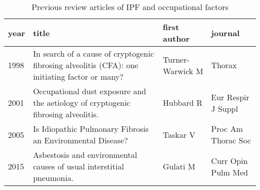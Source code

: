 \documentclass[a4paper,12pt]{article}
\begin{document}
\begin{table}
    \begin{tabular}{lp{6cm}ll}
    \textbf{year} & \textbf{title} &       \textbf{first author} &            \textbf{journal} \\
    \midrule
    1998    &  In search of a cause of cryptogenic fibrosing alveolitis (CFA): one initiating factor or many?       &  Turner-Warwick M &              Thorax \\
    2001    &               Occupational dust exposure and the aetiology of cryptogenic fibrosing alveolitis. &         Hubbard R &  Eur Respir J Suppl \\
    2005    &  Is Idiopathic Pulmonary Fibrosis an Environmental Disease?
            &          Taskar V &  Proc Am Thorac Soc \\
    2015    &                            Asbestosis and environmental causes of usual interstitial pneumonia.  &          Gulati M &  Curr Opin Pulm Med \\
    \bottomrule
    \end{tabular}
    \caption{Previous review articles of IPF and occupational factors}
    \label{table:reviews}
\end{table}
\end{document}
